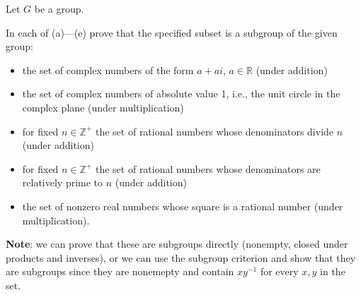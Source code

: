 \documentclass[12pt]{article}
\newenvironment{problem}[2][Exercise]{\begin{trivlist}
\item[\hskip \labelsep {\bfseries #1}\hskip \labelsep {\bfseries #2.}]}{\end{trivlist}}
\begin{document}
Let $G$ be a group.\\
\begin{problem}{1.2.1}
In each of (a)---(e) prove that the specified subset is a subgroup of the given group:
\begin{itemize}
\item the set of complex numbers of the form $a+ai$, $a\in\mathbb{R}$ (under addition)
\item the set of complex numbers of absolute value 1, i.e., the unit circle in the complex plane (under multiplication)
\item for fixed $n\in \mathbb{Z}^+$ the set of rational numbers whose denominators divide $n$ (under addition)
\item for fixed $n\in \mathbb{Z}^+$ the set of rational numbers whose denominators are relatively prime to $n$ (under addition)
\item the set of nonzero real numbers whose square is a rational number (under multiplication).
\end{itemize}
\end{problem}
\textbf{Note}: we can prove that these are subgroups directly (nonempty, closed under products and inverses), or we can use the subgroup criterion and show that they are subgroups since they are nonemepty and contain $xy^{-1}$ for every $x,y$ in the set.
\end{document}
